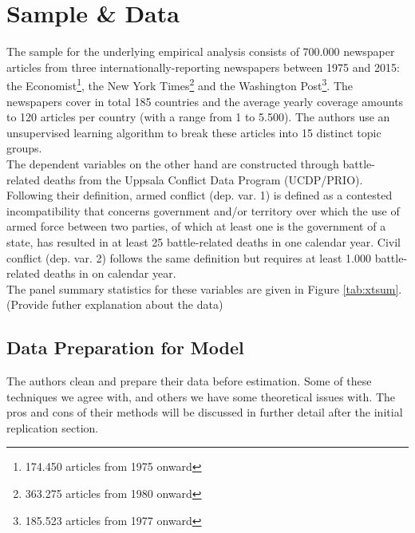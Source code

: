 \section{Sample \& Data}

The sample for the underlying empirical analysis consists of 700.000 newspaper articles from three internationally-reporting newspapers between 1975 and 2015: the Economist\footnote{174.450 articles from 1975 onward}, the New York Times\footnote{363.275 articles from 1980 onward} and the Washington Post\footnote{185.523 articles from 1977 onward}. The newspapers cover in total 185 countries and the average yearly coverage amounts to 120 articles per country (with a range from 1 to 5.500). The authors use an unsupervised learning algorithm to break these articles into 15 distinct topic groups. \\

The dependent variables on the other hand are constructed through battle-related deaths from the Uppsala Conflict Data Program (UCDP/PRIO). Following their definition, armed conflict (dep. var. 1) is defined as a contested incompatibility that concerns government and/or territory over which the use of armed force between two parties, of which at least one is the government of a state, has resulted in at least 25 battle-related deaths in one calendar year. Civil conflict (dep. var. 2) follows the same definition but requires at least 1.000 battle-related deaths in on calendar year. \\

The panel summary statistics for these variables are given in Figure \ref{tab:xtsum}. (Provide futher explanation about the data)

\subsection{Data Preparation for Model}
The authors clean and prepare their data before estimation. Some of these techniques we agree with, and others we have some theoretical issues with. The pros and cons of their methods will be discussed in further detail after the initial replication section.

